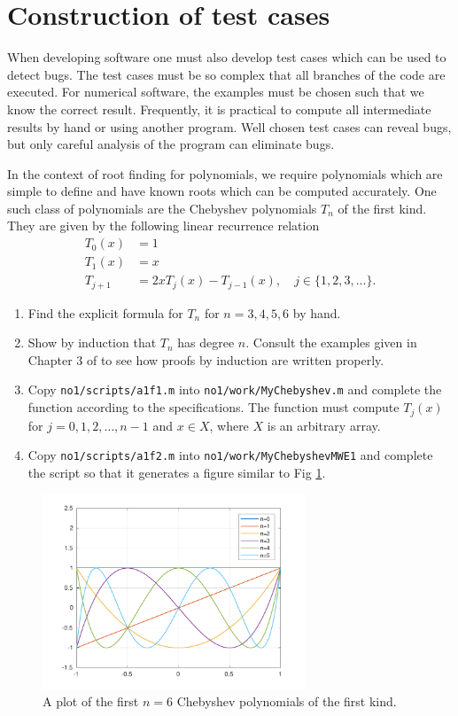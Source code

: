 \documentclass[a4paper,12pt]{article}
\begin{document}
\section{Construction of test cases} 

When developing software one must also develop test cases which can be used to detect bugs. The test cases must be so complex that all branches of the code are executed. For numerical software, the examples must be chosen such that we know the correct result. Frequently, it is practical to compute all intermediate results by hand or using another program. Well chosen test cases can reveal bugs, but only careful analysis of the program can eliminate bugs.

In the context of root finding for polynomials, we require polynomials which are simple to define and have known roots which can be computed accurately. One such class of polynomials are the Chebyshev polynomials $T_n$ of the first kind. They are given by the following linear recurrence relation
\begin{align}
  T_0(x) &= 1 \\
  T_1(x) &= x \\
  T_{j+1} &= 2x T_j(x) - T_{j-1}(x), \quad j \in \{1,2,3,\dotsc\}.
\end{align}

\begin{enumerate}
\item Find the explicit formula for $T_n$ for $n=3,4,5,6$ by hand.
\item Show by induction that $T_n$ has degree $n$. Consult the examples given in Chapter 3 of \cite{mikkelsen2018} to see how proofs by induction are written properly.
\item Copy {\tt no1/scripts/a1f1.m} into {\tt no1/work/MyChebyshev.m} and complete the function according to the specifications. The function must compute $T_j(x)$ for $j=0,1,2,\dots,n-1$ and $x \in X$, where $X$ is an arbitrary array.
\item Copy {\tt no1/scripts/a1f2.m} into {\tt no1/work/MyChebyshevMWE1} and complete the script so that it generates a figure similar to Fig \ref{fig:PlotChebyshev}.
\end{enumerate}

\begin{figure}
  \centering
  \includegraphics[width=0.7\textwidth]{PlotChebyshev.pdf} \caption[Plot of the first few Chebyshev polynomials of the first kind.]{A plot of the first $n=6$ Chebyshev polynomials of the first kind.} \label{fig:PlotChebyshev}
\end{figure}
\end{document}
